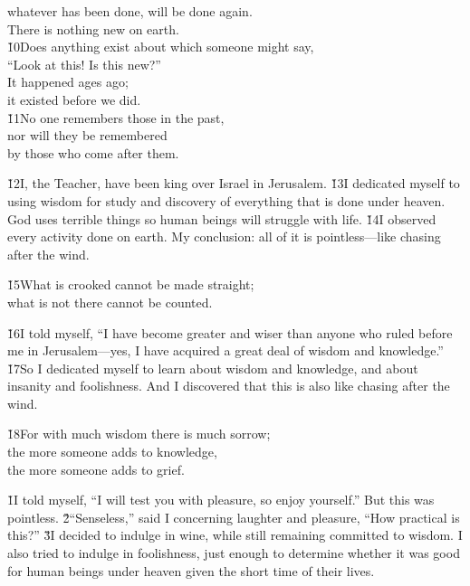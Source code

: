 \begin{poetry}
\poemll    whatever has been done, will be done again. \\
\poemlll       There is nothing new on earth. \\
\poeml \v{10}Does anything exist about which someone might say, \\
\poemll    ``Look at this! Is this new?'' \\
\poeml It happened ages ago; \\
\poemll    it existed before we did. \\
\poeml \v{11}No one remembers those in the past, \\
\poemll    nor will they be remembered \\
\poemlll       by those who come after them.
\end{poetry}

\v{12}I, the Teacher, have been king over Israel in Jerusalem. \v{13}I dedicated myself to using wisdom for study and discovery of everything that is done under heaven. God uses terrible things so human beings will struggle with life. \v{14}I observed every activity done on earth. My conclusion: all of it is pointless---like chasing after the wind.

\begin{poetry}
\poeml \v{15}What is crooked cannot be made straight; \\
\poemll    what is not there cannot be counted.
\end{poetry}

\v{16}I told myself, ``I have become greater and wiser than anyone who ruled before me in Jerusalem---yes, I have acquired a great deal of wisdom and knowledge.'' \v{17}So I dedicated myself to learn about wisdom and knowledge, and about insanity and foolishness. And I discovered that this is also like chasing after the wind.

\begin{poetry}
\poeml \v{18}For with much wisdom there is much sorrow; \\
\poemll    the more someone adds to knowledge, \\
\poemlll       the more someone adds to grief.
\end{poetry}

\v{1}I told myself, ``I will test you with pleasure, so enjoy yourself.'' But this was pointless. \v{2}``Senseless,'' said I concerning laughter and pleasure, ``How practical is this?'' \v{3}I decided to indulge in wine, while still remaining committed to wisdom. I also tried to indulge in foolishness, just enough to determine whether it was good for human beings under heaven given the short time of their lives.

